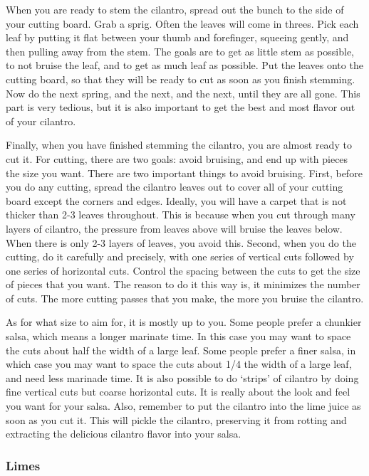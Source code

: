 When you are ready to stem the cilantro, spread out the bunch to the side of your cutting board. Grab a sprig. Often the leaves will come in threes. Pick each leaf by putting it flat between your thumb and forefinger, squeeing gently, and then pulling away from the stem. The goals are to get as little stem as possible, to not bruise the leaf, and to get as much leaf as possible. Put the leaves onto the cutting board, so that they will be ready to cut as soon as you finish stemming. Now do the next spring, and the next, and the next, until they are all gone. This part is very tedious, but it is also important to get the best and most flavor out of your cilantro.

Finally, when you have finished stemming the cilantro, you are almost ready to cut it. For cutting, there are two goals: avoid bruising, and end up with pieces the size you want. There are two important things to avoid bruising. First, before you do any cutting, spread the cilantro leaves out to cover all of your cutting board except the corners and edges. Ideally, you will have a carpet that is not thicker than 2-3 leaves throughout. This is because when you cut through many layers of cilantro, the pressure from leaves above will bruise the leaves below. When there is only 2-3 layers of leaves, you avoid this. Second, when you do the cutting, do it carefully and precisely, with one series of vertical cuts followed by one series of horizontal cuts. Control the spacing between the cuts to get the size of pieces that you want. The reason to do it this way is, it minimizes the number of cuts. The more cutting passes that you make, the more you bruise the cilantro. 

As for what size to aim for, it is mostly up to you. Some people prefer a chunkier salsa, which means a longer marinate time. In this case you may want to space the cuts about half the width of a large leaf. Some people prefer a finer salsa, in which case you may want to space the cuts about 1/4 the width of a large leaf, and need less marinade time. It is also possible to do `strips' of cilantro by doing fine vertical cuts but coarse horizontal cuts. It is really about the look and feel you want for your salsa. Also, remember to put the cilantro into the lime juice as soon as you cut it. This will pickle the cilantro, preserving it from rotting and extracting the delicious cilantro flavor into your salsa.

\subsubsection{Limes}

